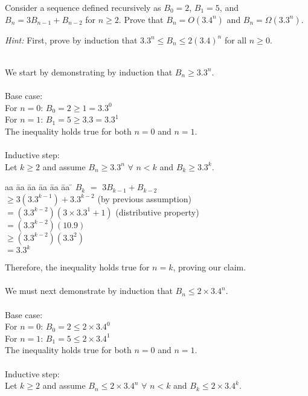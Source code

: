 \documentclass{article}
\begin{document}
\begin{problem}
Consider a sequence defined recursively as
$B_0 = 2$, $B_1 = 5$, and $B_n = 3B_{n-1}+B_{n-2}$ for
$n\ge 2$. Prove that $B_n = O(3.4^n)$ and $B_n = \Omega(3.3^n)$.

\smallskip
\noindent
\emph{Hint:} 
First, prove by induction that $3.3^n \le B_n \le 2(3.4)^n$ for all $n\ge 0$.

\begin{solution}
\\We start by demonstrating by induction that $B_n \ge 3.3^n$. \\
\\ Base case:
\\ For $n = 0$: $B_0 = 2 \ge 1 = 3.3^0$
\\ For $n = 1$: $B_1 = 5 \ge 3.3 = 3.3^1$ 
\\ The inequality holds true for both $n = 0$ and $n = 1$.
\\
\\ Inductive step:
\\ Let $k \ge 2$ and assume $B_n \ge 3.3^n$ $\forall$ $ n < k $ and $B_k \ge 3.3^k$.
\begin{tabbing}
aa \= aa \= aa \= aa \= aa \= aa \= \kill
$B_k$ \> \>$=$ $3B_{k-1} + B_{k-2}$ \\
\>  \>$\ge 3(3.3^{k-1}) + 3.3^{k-2}$  (by previous assumption) \\
\> \>$= (3.3^{k-2})(3 \times 3.3^1 + 1)$  (distributive property) \\
\> \>$= (3.3^{k-2})(10.9)$ \\
\> \>$\ge (3.3^{k-2})(3.3^2)$ \\
\> \>$= 3.3^k$
\end{tabbing}
Therefore, the inequality holds true for $n=k $, proving our claim. \\
\\ We must next demonstrate by induction that $B_n \le 2 \times 3.4^n$. \\
\\ Base case:
\\ For $n = 0$: $B_0 = 2 \le 2 \times 3.4^0$
\\ For $n = 1$: $B_1 = 5 \le 2 \times 3.4^1$ 
\\ The inequality holds true for both $n = 0$ and $n = 1$.
\\
\\ Inductive step:
\\ Let $k \ge 2$ and assume $B_n \le 2 \times 3.4^n$ $\forall$ $ n < k $ and $B_k \le 2 \times 3.4^k$. 

\end{solution}
\end{problem}
\end{document}
